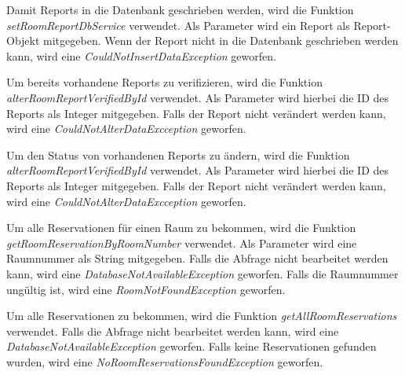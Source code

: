 

Damit Reports in die Datenbank geschrieben werden, wird die Funktion \emph{setRoomReportDbService} verwendet. Als Parameter wird ein Report als Report-Objekt mitgegeben. Wenn der Report nicht in die Datenbank geschrieben werden kann, wird eine \emph{CouldNotInsertDataException} geworfen.



Um bereits vorhandene Reports zu verifizieren, wird die Funktion \emph{alterRoomReportVerifiedById} verwendet. Als Parameter wird hierbei die ID des Reports als Integer mitgegeben. Falls der Report nicht verändert werden kann, wird eine \emph{CouldNotAlterDataExcception} geworfen.


Um den Status von vorhandenen Reports zu ändern, wird die Funktion \emph{alterRoomReportVerifiedById} verwendet. Als Parameter wird hierbei die ID des Reports als Integer mitgegeben. Falls der Report nicht verändert werden kann, wird eine \emph{CouldNotAlterDataExcception} geworfen.



Um alle Reservationen für einen Raum zu bekommen, wird die Funktion \emph{getRoomReservationByRoomNumber} verwendet. Als Parameter wird eine Raumnummer als String mitgegeben. Falls die Abfrage nicht bearbeitet werden kann, wird eine \emph{DatabaseNotAvailableException} geworfen. Falls die Raumnummer ungültig ist, wird eine \emph{RoomNotFoundException} geworfen.


Um alle Reservationen zu bekommen, wird die Funktion \emph{getAllRoomReservations} verwendet. Falls die Abfrage nicht bearbeitet werden kann, wird eine \emph{DatabaseNotAvailableException} geworfen. Falls keine Reservationen gefunden wurden, wird eine \emph{NoRoomReservationsFoundException} geworfen.

